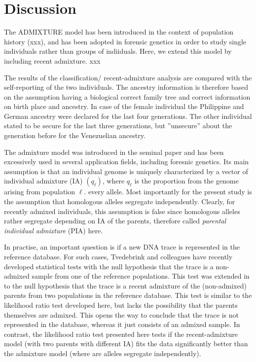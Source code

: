 \documentclass[12pt]{article}
\theoremstyle{definition}
\begin{document}
\section{Discussion}
The {\sc ADMIXTURE} model has been introduced in the context of
population history (xxx), and has been adopted in forensic genetics in
order to study single individuals rather than groups of
indiiduals. Here, we extend this model by including recent
admixture. xxx


The results of the classification/ recent-admixture analysis are
compared with the self-reporting of the two individuals. The ancestry
information is therefore based on the assumption having a biological
correct family tree and correct information on birth place and
ancestry. In case of the female individual the Philippine and German
ancestry were declared for the last four generations. The other
individual stated to be secure for the last three generations, but
”unsecure” about the generation before for the Venezuelian ancestry.



The admixture model was introduced in the seminal paper
\cite{Pritchard} and has been excessively used in several application
fields, including foresnic genetics. Its main assumption is that an
individual genome is uniquely characterized by a vector of individual
admixture (IA) $(q_\ell)$, where $q_\ell$ is the proportion from the
genome arising from population $\ell$. every allele. Most importantly
for the present study is the assumption that homologous alleles
segregate independently. Clearly, for recently admixed individuals,
this assumption is false since homologous alleles rather segregate
depending on IA of the parents, therefore called {\em parental
  individual admixture} (PIA) here.



In practise, an important question is if a new DNA trace is
represented in the reference database. For such cases, Tvedebrink and
colleagues have recently developed statistical tests with the null
hypothesis that the trace is a non-admixed sample from one of the
reference populations. This test was extended in \cite{Tvedebrink2019}
to the null hypothesis that the trace is a recent admixture of the
(non-admixed) parents from two populations in the reference
database. This test is similar to the likelihood ratio test developed
here, but lacks the possibility that the parents themselves are
admixed. This opens the way to conclude that the trace is not
represented in the database, whereas it just consists of an admixed
sample. In contrast, the likelihood ratio test presented here tests if
the recent-admixture model (with two parents with different IA) fits
the data significantly better than the admixture model (where are
alleles segregate independently). 
\end{document}
